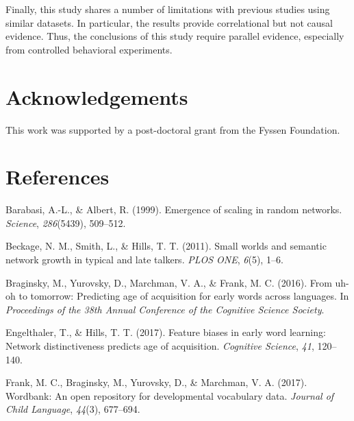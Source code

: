\documentclass[10pt, letterpaper]{article}
\begin{document}
Finally, this study shares a number of limitations with previous studies
using similar datasets. In particular, the results provide correlational
but not causal evidence. Thus, the conclusions of this study require
parallel evidence, especially from controlled behavioral experiments.

\vspace{1em}

\vspace{1em}

\section{Acknowledgements}\label{acknowledgements}

This work was supported by a post-doctoral grant from the Fyssen
Foundation.

\section{References}\label{references}

\setlength{\parindent}{-0.1in} \setlength{\leftskip}{0.125in} \noindent

\hypertarget{refs}{}
\hypertarget{ref-barabasi99}{}
Barabasi, A.-L., \& Albert, R. (1999). Emergence of scaling in random
networks. \emph{Science}, \emph{286}(5439), 509--512.

\hypertarget{ref-beckage2011}{}
Beckage, N. M., Smith, L., \& Hills, T. T. (2011). Small worlds and
semantic network growth in typical and late talkers. \emph{PLOS ONE},
\emph{6}(5), 1--6.

\hypertarget{ref-braginsky2016}{}
Braginsky, M., Yurovsky, D., Marchman, V. A., \& Frank, M. C. (2016).
From uh-oh to tomorrow: Predicting age of acquisition for early words
across languages. In \emph{Proceedings of the 38th Annual Conference of
the Cognitive Science Society}.

\hypertarget{ref-engelthaler2017}{}
Engelthaler, T., \& Hills, T. T. (2017). Feature biases in early word
learning: Network distinctiveness predicts age of acquisition.
\emph{Cognitive Science}, \emph{41}, 120--140.

\hypertarget{ref-frank2017}{}
Frank, M. C., Braginsky, M., Yurovsky, D., \& Marchman, V. A. (2017).
Wordbank: An open repository for developmental vocabulary data.
\emph{Journal of Child Language}, \emph{44}(3), 677--694.
\end{document}
